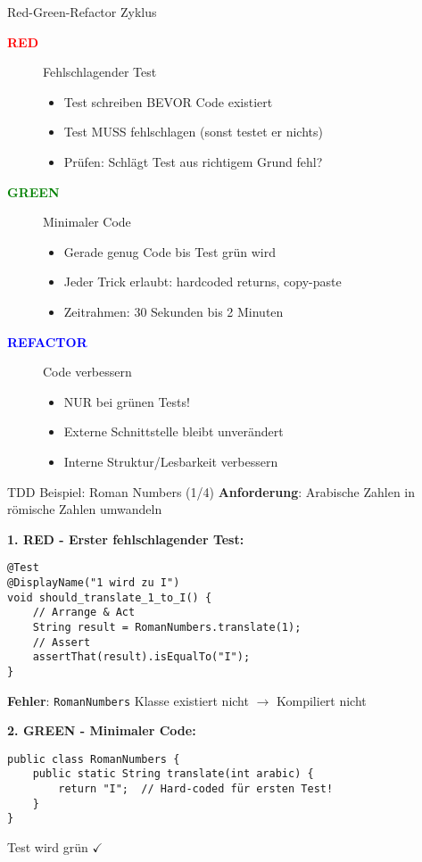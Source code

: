 \begin{frame}{Red-Green-Refactor Zyklus}
  \begin{description}
    \item[\textcolor{red}{\textbf{RED}}] Fehlschlagender Test
      \begin{itemize}
        \item Test schreiben BEVOR Code existiert
        \item Test MUSS fehlschlagen (sonst testet er nichts)
        \item Prüfen: Schlägt Test aus richtigem Grund fehl?
      \end{itemize}

    \item[\textcolor{green}{\textbf{GREEN}}] Minimaler Code
      \begin{itemize}
        \item Gerade genug Code bis Test grün wird
        \item Jeder Trick erlaubt: hardcoded returns, copy-paste
        \item Zeitrahmen: 30 Sekunden bis 2 Minuten
      \end{itemize}

    \item[\textcolor{blue}{\textbf{REFACTOR}}] Code verbessern
      \begin{itemize}
        \item NUR bei grünen Tests!
        \item Externe Schnittstelle bleibt unverändert
        \item Interne Struktur/Lesbarkeit verbessern
      \end{itemize}
  \end{description}
\end{frame}

\begin{frame}[fragile]{TDD Beispiel: Roman Numbers (1/4)}
  \textbf{Anforderung}: Arabische Zahlen in römische Zahlen umwandeln

  \textbf{1. RED - Erster fehlschlagender Test:}
  \begin{lstlisting}[style=java, basicstyle=\tiny\ttfamily]
@Test
@DisplayName("1 wird zu I")
void should_translate_1_to_I() {
    // Arrange & Act
    String result = RomanNumbers.translate(1);
    // Assert
    assertThat(result).isEqualTo("I");
}
  \end{lstlisting}

  \textbf{Fehler}: \texttt{RomanNumbers} Klasse existiert nicht $\rightarrow$ Kompiliert nicht

  \textbf{2. GREEN - Minimaler Code:}
  \begin{lstlisting}[style=java, basicstyle=\tiny\ttfamily]
public class RomanNumbers {
    public static String translate(int arabic) {
        return "I";  // Hard-coded für ersten Test!
    }
}
  \end{lstlisting}

  Test wird grün $\checkmark$
\end{frame}

